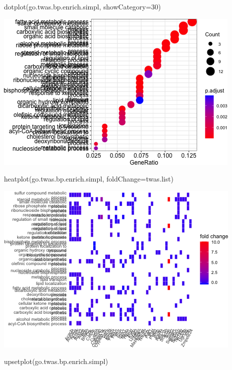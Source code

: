 \documentclass[
]{article}
\newenvironment{Shaded}{\begin{snugshade}}{\end{snugshade}}
\newcommand{\AttributeTok}[1]{\textcolor[rgb]{0.77,0.63,0.00}{#1}}
\newcommand{\DecValTok}[1]{\textcolor[rgb]{0.00,0.00,0.81}{#1}}
\newcommand{\FunctionTok}[1]{\textcolor[rgb]{0.00,0.00,0.00}{#1}}
\newcommand{\NormalTok}[1]{#1}
\begin{document}
\begin{Shaded}
\begin{Highlighting}[]
\FunctionTok{dotplot}\NormalTok{(go.twas.bp.enrich.simpl, }\AttributeTok{showCategory=}\DecValTok{30}\NormalTok{)}
\end{Highlighting}
\end{Shaded}

\includegraphics{figures/twas-go-7.png}

\begin{Shaded}
\begin{Highlighting}[]
\FunctionTok{heatplot}\NormalTok{(go.twas.bp.enrich.simpl, }\AttributeTok{foldChange=}\NormalTok{twas.list)}
\end{Highlighting}
\end{Shaded}

\includegraphics{figures/twas-go-8.png}

\begin{Shaded}
\begin{Highlighting}[]
\FunctionTok{upsetplot}\NormalTok{(go.twas.bp.enrich.simpl)}
\end{Highlighting}
\end{Shaded}
\end{document}
